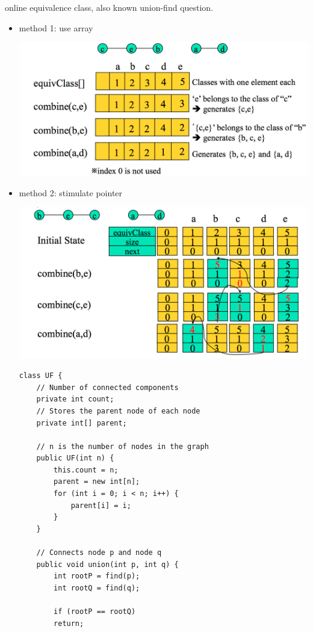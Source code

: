 \documentclass[a4paper,11pt,twoside]{book}
\begin{document}
	\par online equivalence class, also known union-find question.  
	\begin{itemize}
		\item method 1: use array  
\begin{center}
	\includegraphics[scale=0.55]{pics/online_1.png} 
\end{center}
		
		
		\item method 2: stimulate pointer
\begin{center}
	\includegraphics[scale=0.55]{pics/online_2.png}  
\end{center}

\begin{lstlisting}
class UF { 
	// Number of connected components
	private int count;
	// Stores the parent node of each node
	private int[] parent;
	
	// n is the number of nodes in the graph
	public UF(int n) {
		this.count = n;
		parent = new int[n];
		for (int i = 0; i < n; i++) {
			parent[i] = i;
		}
	}
	
	// Connects node p and node q
	public void union(int p, int q) {
		int rootP = find(p);
		int rootQ = find(q);
		
		if (rootP == rootQ)
		return;
		

\end{lstlisting}
\end{itemize}
\end{document}
